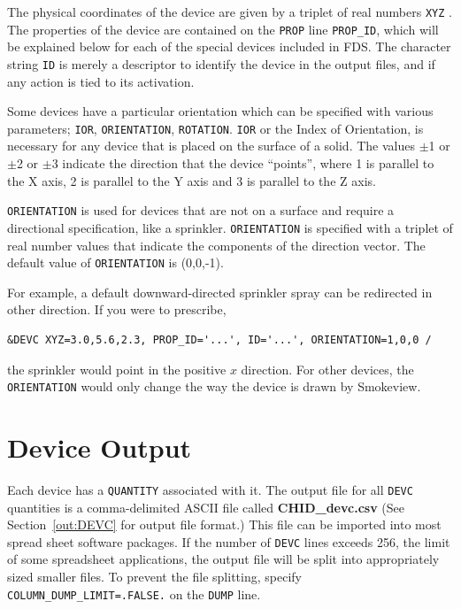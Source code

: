 \documentclass[11pt]{book}
\newcommand{\ct}{\tt\small}
\begin{document}
\noindent
The physical coordinates of the
device are given by a triplet of real numbers {\ct XYZ} .
The properties of the device are contained on the {\ct PROP} line
{\ct PROP\_ID}, which will be explained below for each of the
special devices included in FDS.
The character string {\ct ID} is merely a descriptor to identify the
device in the output files, and if any action is tied to its activation.

Some devices have a particular orientation which can be specified
with various parameters; {\ct IOR}, {\ct ORIENTATION}, {\ct ROTATION}.
{\ct IOR} or the Index of Orientation, is necessary for any device that is
placed on the surface of a solid. The values $\pm$1 or $\pm$2 or $\pm$3 indicate the direction
that the device ``points'', where 1 is parallel to the X axis, 2 is parallel to the Y axis
and 3 is parallel to the Z axis.

{\ct ORIENTATION} is used for devices that are not on a surface
and require a directional specification, like a sprinkler. {\ct ORIENTATION} is specified with a
triplet of real number values that indicate the components of the direction vector.
The default value of {\ct ORIENTATION} is (0,0,-1).

For example, a default downward-directed sprinkler spray can be redirected in other direction.
If you were to prescribe,

\footnotesize
\begin{verbatim}
&DEVC XYZ=3.0,5.6,2.3, PROP_ID='...', ID='...', ORIENTATION=1,0,0 /
\end{verbatim}
\normalsize

\noindent
the sprinkler would point in the positive $x$ direction.
For other devices, the {\ct ORIENTATION} would only change the way the device is drawn by Smokeview.



\section{Device Output}
\label{info:out:DEVC}

Each device has a {\ct QUANTITY} associated with it.
The output file for all {\ct DEVC} quantities is a comma-delimited
ASCII file called {\bf CHID\_devc.csv} 
(See Section~\ref{out:DEVC} for output file format.)
This file can be imported into most spread sheet software packages.
If the number of {\ct DEVC} lines exceeds 256, the limit of some spreadsheet
applications, the output file will be split into appropriately sized smaller
files. To prevent the file splitting, specify {\ct COLUMN\_DUMP\_LIMIT=.FALSE.}
 on the {\ct DUMP} line.
\end{document}
